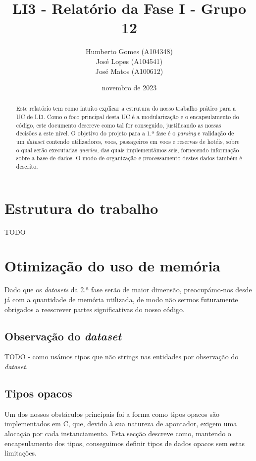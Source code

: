 \documentclass[12pt, a4paper]{article}
\title{\textbf{LI3 - Relatório da Fase I - Grupo 12}}
\author{
	Humberto Gomes (A104348) \\
	José Lopes     (A104541) \\
	José Matos     (A100612) \\
}
\date{novembro de 2023}
\begin{document}
\maketitle
\onehalfspacing
\setlength{\parskip}{\baselineskip}
\setlength{\parindent}{0pt}

\begin{abstract}
    Este relatório tem como intuito explicar a estrutura do nosso trabalho prático para a UC de LI3.
    Como o foco principal desta UC é a modularização e o encapsulamento do código, este documento
    descreve como tal for conseguido, justificando as nossas decisões a este nível. O objetivo do
    projeto para a 1.ª fase é o \emph{parsing} e validação de um \emph{dataset} contendo
    utilizadores, voos, passageiros em voos e reservas de hotéis, sobre o qual serão executadas
    \emph{queries}, das quais implementámos seis, fornecendo informação sobre a base de dados. O
    modo de organização e processamento destes dados também é descrito.
\end{abstract}

\section{Estrutura do trabalho}

TODO

\section{Otimização do uso de memória}

Dado que os \emph{datasets} da 2.ª fase serão de maior dimensão, preocupámo-nos desde já com a
quantidade de memória utilizada, de modo não sermos futuramente obrigados a reescrever partes
significativas do nosso código.

\subsection{Observação do \emph{dataset}}

TODO - como usámos tipos que não strings nas entidades por observação do \emph{dataset}.

\subsection{Tipos opacos}

Um dos nossos obstáculos principais foi a forma como tipos opacos são implementados em C, que,
devido à sua natureza de apontador, exigem uma alocação por cada instanciamento. Esta secção
descreve como, mantendo o encapsulamento dos tipos, conseguimos definir tipos de dados opacos sem
estas limitações.
\end{document}
